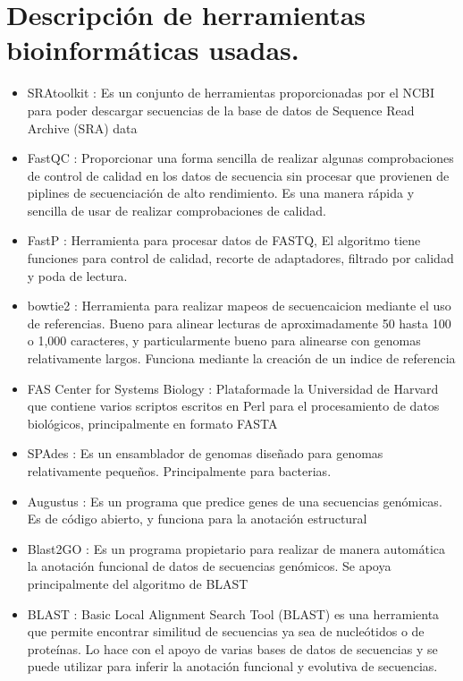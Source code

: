 \documentclass[journal, letterpaper, 11pt]{IEEEtran}
\begin{document}
\section{Descripción de herramientas bioinformáticas usadas.}
\begin{itemize}
\item SRAtoolkit : Es un conjunto de herramientas proporcionadas por el NCBI para poder descargar secuencias de la base de datos de Sequence Read Archive (SRA) data
\item FastQC : Proporcionar una forma sencilla de realizar algunas comprobaciones de control de calidad en los datos de secuencia sin procesar que provienen de piplines de secuenciación de alto rendimiento. Es una manera rápida y sencilla de usar de realizar comprobaciones de calidad.
\item FastP : Herramienta para procesar datos de FASTQ, El algoritmo tiene funciones para control de calidad, recorte de adaptadores, filtrado por calidad y poda de lectura. 
\item bowtie2 : Herramienta para realizar mapeos de secuencaicion mediante el uso de referencias. Bueno para alinear lecturas de aproximadamente 50 hasta 100 o 1,000 caracteres, y particularmente bueno para alinearse con genomas relativamente largos. Funciona mediante la creación de un indice de referencia
\item FAS Center for Systems Biology : Plataformade la Universidad de Harvard que contiene varios scriptos escritos en Perl para el procesamiento de datos biológicos, principalmente en formato FASTA
\item SPAdes : Es un ensamblador de genomas diseñado para genomas relativamente pequeños. Principalmente para bacterias.
\item Augustus : Es un programa que predice genes de una secuencias genómicas. Es de código abierto, y funciona para la anotación estructural
\item Blast2GO : Es un programa propietario para realizar de manera automática la anotación funcional de datos de secuencias genómicos. Se apoya principalmente del algoritmo de BLAST
\item BLAST : Basic Local Alignment Search Tool (BLAST) es una herramienta que permite encontrar similitud de secuencias ya sea de nucleótidos o de proteínas. Lo hace con el apoyo de varias bases de datos de secuencias y se puede utilizar para inferir la anotación funcional y evolutiva de secuencias.
\end{itemize}
\end{document}
